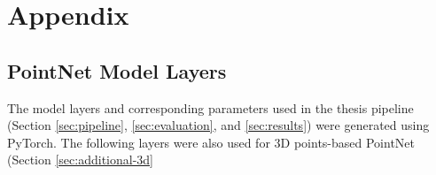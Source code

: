 \chapter*{Appendix} 
\label{appendix}
\ifpdf
    \graphicspath{{13_appendix/figures/PNG/}{13_appendix/figures/PDF/}{13_appendix/figures/}}
\else
    \graphicspath{{13_appendix/figures/EPS/}{13_appendix/figures/}}
\fi

\section*{PointNet Model Layers}
\label{appendix-layers}
The model layers and corresponding parameters used in the thesis pipeline (Section \ref{sec:pipeline}, \ref{sec:evaluation}, and \ref{sec:results}) were generated using PyTorch. The following layers were also used for 3D points-based PointNet (Section \ref{sec:additional-3d}
